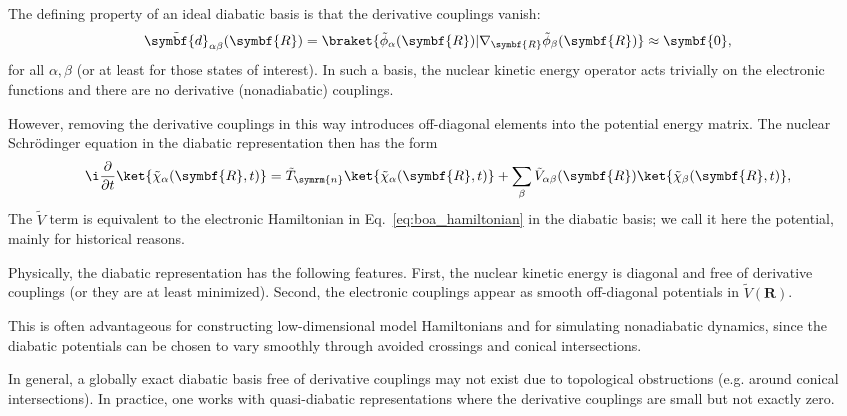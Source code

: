The defining property of an ideal diabatic basis is that the derivative couplings vanish:
\begin{equation}
\tilde{\symbf{d}}_{\alpha\beta}(\symbf{R})=\braket{\tilde\phi_\alpha(\symbf{R})\vert\nabla_{\symbf{R}}\tilde\phi_\beta(\symbf{R})}\approx\symbf{0},
\end{equation}
for all $\alpha,\beta$ (or at least for those states of interest). In such a basis, the nuclear kinetic energy operator acts trivially on the electronic functions and there are no derivative (nonadiabatic) couplings.

However, removing the derivative couplings in this way introduces off-diagonal elements into the potential energy matrix. The nuclear Schr\"odinger equation in the diabatic representation then has the form
\begin{equation}
\i\frac{\partial}{\partial{t}}\ket{\tilde\chi_\alpha(\symbf{R},t)}=\tilde{T}_{\symrm{n}}\ket{\tilde\chi_\alpha(\symbf{R},t)}+\sum_\beta\tilde{V}_{\alpha\beta}(\symbf{R})\ket{\tilde\chi_\beta(\symbf{R},t)},
\end{equation}
The $\tilde{V}$ term is equivalent to the electronic Hamiltonian in Eq.~\eqref{eq:boa_hamiltonian} in the diabatic basis; we call it here the potential, mainly for historical reasons.

Physically, the diabatic representation has the following features. First, the nuclear kinetic energy is diagonal and free of derivative couplings (or they are at least minimized). Second, the electronic couplings appear as smooth off-diagonal potentials in $\tilde{V}(\symbf{R})$.

This is often advantageous for constructing low-dimensional model Hamiltonians and for simulating nonadiabatic dynamics, since the diabatic potentials can be chosen to vary smoothly through avoided crossings and conical intersections.

In general, a globally exact diabatic basis free of derivative couplings may not exist due to topological obstructions (e.g. around conical intersections). In practice, one works with quasi-diabatic representations where the derivative couplings are small but not exactly zero.

